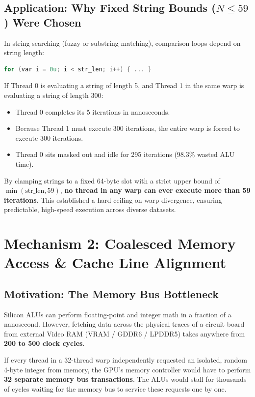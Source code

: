 \documentclass[a4paper,11pt]{article}
\begin{document}
\subsection{Application: Why Fixed String Bounds ($N \le 59$) Were Chosen}

In string searching (fuzzy or substring matching), comparison loops depend on string length:
\begin{lstlisting}[language=C]
for (var i = 0u; i < str_len; i++) { ... }
\end{lstlisting}

If Thread 0 is evaluating a string of length 5, and Thread 1 in the same warp is evaluating a string of length 300:
\begin{itemize}
  \item Thread 0 completes its 5 iterations in nanoseconds.
  \item Because Thread 1 must execute 300 iterations, the entire warp is forced to execute 300 iterations.
  \item Thread 0 sits masked out and idle for 295 iterations ($98.3\%$ wasted ALU time).
\end{itemize}

By clamping strings to a fixed 64-byte slot with a strict upper bound of $\min(\text{str\_len}, 59)$, \textbf{no thread in any warp can ever execute more than 59 iterations}. This established a hard ceiling on warp divergence, ensuring predictable, high-speed execution across diverse datasets.

\newpage

\section{Mechanism 2: Coalesced Memory Access \& Cache Line Alignment}

\subsection{Motivation: The Memory Bus Bottleneck}

Silicon ALUs can perform floating-point and integer math in a fraction of a nanosecond. However, fetching data across the physical traces of a circuit board from external Video RAM (VRAM / GDDR6 / LPDDR5) takes anywhere from \textbf{200 to 500 clock cycles}.

If every thread in a 32-thread warp independently requested an isolated, random 4-byte integer from memory, the GPU's memory controller would have to perform \textbf{32 separate memory bus transactions}. The ALUs would stall for thousands of cycles waiting for the memory bus to service these requests one by one.
\end{document}
